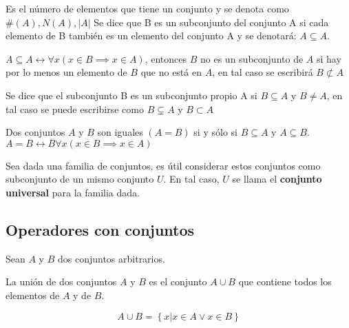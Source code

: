 \begin{definition}[Cardinalidad]
	Es el número de elementos que tiene un conjunto y se denota como
	$\#(A), N(A), |A|$
	Se dice que B es un subconjunto del conjunto A si cada elemento de B también es un elemento del conjunto A y se denotará: $A \subseteq A$.
\end{definition}

$A \subseteq A \longleftrightarrow \forall x (x \in B \implies x \in A) $, entonces
$B$ no es un subconjunto de $A$ si hay por lo menos un elemento de $B$ que no está en $A$, en tal caso se escribirá $B \not \subset A$

Se dice que el subconjunto B es un subconjunto propio A si $B \subseteq A$ y $B \neq A$, en tal caso se puede escribirse como $B \subsetneq A$ y  $B \subset A$

Dos conjuntos $A$ y $B$ son iguales $(A=B)$ si y sólo si $B \subseteq A$ y $A  \subseteq B$.
$A = B \longleftrightarrow B \forall x (x \in B \implies x \in A)$

\begin{definition}
	Sea dada una familia de conjuntos, es útil considerar estos conjuntos como subconjunto de un mismo conjunto $U$. En tal caso, $U$ se llama el \textbf{conjunto universal} para la familia dada.
\end{definition}


\subsection{Operadores con conjuntos}
Sean $A$ y $B$ dos conjuntos arbitrarios.

\begin{definition}[Unión]
	La unión de dos conjuntos $A$ y $B$ es el conjunto $A \cup B$ que contiene todos los elementos de $A$ y de $B$.
\end{definition}

\begin{equation}
	A\cup B=\left\{ x\vert x\in A\vee x\in B \right\}
\end{equation}

\begin{center}
\end{center}

